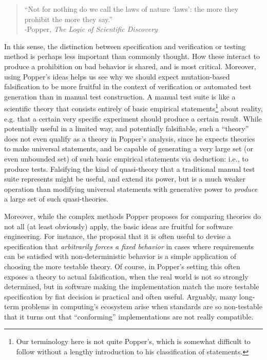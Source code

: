 \documentclass{svjour3}
\begin{document}
\begin{quote}
``Not for nothing do we call the laws of nature `laws': the more they
prohibit the more they say.''\\
-Popper, \emph{The Logic of Scientific Discovery} \cite{Popper}
\end{quote}

\noindent In this sense, the distinction between specification and
verification or testing method is perhaps less important than commonly
thought.  How these interact to produce a prohibition on bad behavior
is shared, and is most critical.  Moreover, using Popper's ideas helps
us see why we should expect mutation-based falsification to be more
fruitful in the context of verification or automated test generation
than in manual test construction.  A manual test suite is like a
scientific theory that consists entirely of basic empirical
statements\footnote{Our terminology here is not quite Popper's, which
  is somewhat difficult to follow without a lengthy introduction to
 his  classification of statements.} about
reality, e.g. that a certain very specific experiment should produce a certain
result.   While potentially useful in a limited way, and potentially falsifiable, such
a ``theory'' does not even qualify as a theory in Popper's analysis,
since he expects theories to make universal statements, and be capable
of generating a very large set (or even unbounded set) of such basic
empirical statements via deduction: i.e., to produce tests.  Falsifying the kind of quasi-theory
that a traditional manual test suite represents might be useful, and
extend its power, but is a much weaker operation than modifying
universal statements with generative power to \emph{produce} a large
set of such quasi-theories.

Moreover, while the complex methods Popper proposes for comparing
theories do not all (at least obviously)
apply, the basic ideas are fruitful for software engineering.  For
instance, the proposal that it is often useful to devise a specification that \emph{arbitrarily
forces a fixed behavior} in cases where requirements can be
satisfied with non-deterministic behavior \cite{ICSEDiff} is a simple
application of choosing the more testable theory.  Of course, in
Popper's setting this often exposes a theory to actual falsification,
when the real world is not so strongly determined, but in software
making the implementation match the more testable specification by fiat decision is
practical and often useful.  Arguably, many long-term problems in
computing's ecosystem arise when standards are so non-testable that it
turns out that ``conforming'' implementations are not really
compatible.
\end{document}
